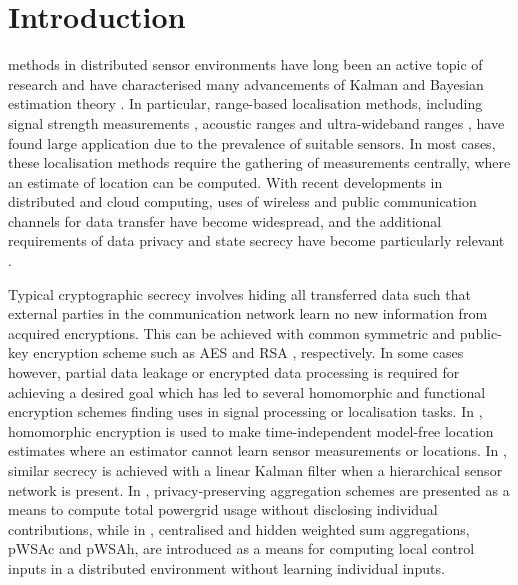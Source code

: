 \documentclass[10pt,letterpaper,oneside,twocolumn,journal]{IEEEtran}
\theoremstyle{definition}
\theoremstyle{definition}
\theoremstyle{remark}
\begin{document}
\section{Introduction} \label{sec:introduction}
 methods in distributed sensor environments have long been an active topic of research \cite{pierceIntroductionLoran1946,ligginsDistributedDataFusion2012,liContributedReviewSourcelocalization2016} and have characterised many advancements of Kalman and Bayesian estimation theory \cite{mutambaraDecentralizedEstimationControl1998}. In particular, range-based localisation methods, including signal strength measurements \cite{wangConvexCombinationSource2018,heRangeFreeLocalizationSchemes2003}, acoustic ranges \cite{beutlerNewNonlinearFiltering2004} and ultra-wideband ranges \cite{geziciLocalizationUltraWidebandRadios2005}, have found large application due to the prevalence of suitable sensors. In most cases, these localisation methods require the gathering of measurements centrally, where an estimate of location can be computed. With recent developments in distributed and cloud computing, uses of wireless and public communication channels for data transfer have become widespread, and the additional requirements of data privacy and state secrecy have become particularly relevant \cite{brennerSecretProgramExecution2011,renSecurityChallengesPublic2012}.

Typical cryptographic secrecy involves hiding all transferred data such that external parties in the communication network learn no new information from acquired encryptions. This can be achieved with common symmetric and public-key encryption scheme such as AES \cite{gueronIntelAdvancedEncryption2010} and RSA \cite{rivestMethodObtainingDigital1978}, respectively. In some cases however, partial data leakage or encrypted data processing is required for achieving a desired goal which has led to several homomorphic and functional encryption schemes \cite{paillierPublicKeyCryptosystemsBased1999,shiPrivacyPreservingAggregationTimeSeries2011,joyeScalableSchemePrivacyPreserving2013,chotardDecentralizedMultiClientFunctional2018} finding uses in signal processing or localisation tasks. In \cite{alanwarPrOLocResilientLocalization2017}, homomorphic encryption is used to make time-independent model-free location estimates where an estimator cannot learn sensor measurements or locations. In \cite{aristovEncryptedMultisensorInformation2018}, similar secrecy is achieved with a linear Kalman filter when a hierarchical sensor network is present. In \cite{shiPrivacyPreservingAggregationTimeSeries2011,joyeScalableSchemePrivacyPreserving2013}, privacy-preserving aggregation schemes are presented as a means to compute total powergrid usage without disclosing individual contributions, while in \cite{alexandruEncryptedCooperativeControl2019,alexandruPrivateWeightedSum2020}, centralised and hidden weighted sum aggregations, pWSAc and pWSAh, are introduced as a means for computing local control inputs in a distributed environment without learning individual inputs.
\end{document}
